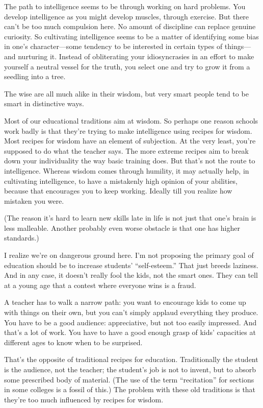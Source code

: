 \documentclass[12pt]{book}
\begin{document}
The path to intelligence seems to be through working on hard problems.
You develop intelligence as you might develop muscles, through exercise.
But there can't be too much compulsion here. No amount of discipline can
replace genuine curiosity. So cultivating intelligence seems to be a
matter of identifying some bias in one's character---some tendency to be
interested in certain types of things---and nurturing it. Instead of
obliterating your idiosyncrasies in an effort to make yourself a neutral
vessel for the truth, you select one and try to grow it from a seedling
into a tree.

The wise are all much alike in their wisdom, but very smart people tend
to be smart in distinctive ways.

Most of our educational traditions aim at wisdom. So perhaps one reason
schools work badly is that they're trying to make intelligence using
recipes for wisdom. Most recipes for wisdom have an element of
subjection. At the very least, you're supposed to do what the teacher
says. The more extreme recipes aim to break down your individuality the
way basic training does. But that's not the route to intelligence.
Whereas wisdom comes through humility, it may actually help, in
cultivating intelligence, to have a mistakenly high opinion of your
abilities, because that encourages you to keep working. Ideally till you
realize how mistaken you were.

(The reason it's hard to learn new skills late in life is not just that
one's brain is less malleable. Another probably even worse obstacle is
that one has higher standards.)

I realize we're on dangerous ground here. I'm not proposing the primary
goal of education should be to increase students' ``self-esteem.'' That
just breeds laziness. And in any case, it doesn't really fool the kids,
not the smart ones. They can tell at a young age that a contest where
everyone wins is a fraud.

A teacher has to walk a narrow path: you want to encourage kids to come
up with things on their own, but you can't simply applaud everything
they produce. You have to be a good audience: appreciative, but not too
easily impressed. And that's a lot of work. You have to have a good
enough grasp of kids' capacities at different ages to know when to be
surprised.

That's the opposite of traditional recipes for education. Traditionally
the student is the audience, not the teacher; the student's job is not
to invent, but to absorb some prescribed body of material. (The use of
the term ``recitation'' for sections in some colleges is a fossil of
this.) The problem with these old traditions is that they're too much
influenced by recipes for wisdom.
\end{document}
